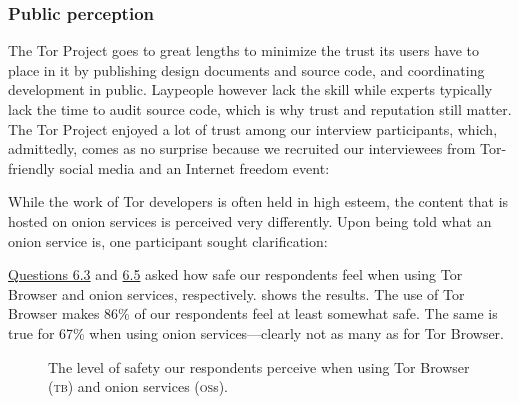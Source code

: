 \subsubsection{Public perception}

The Tor Project goes to great lengths to minimize the trust its users have to
place in it by publishing design documents and source code, and coordinating
development in public.  Laypeople however lack the skill while experts typically
lack the time to audit source code, which is why trust and reputation still
matter.  The Tor Project enjoyed a lot of trust among our interview
participants, which, admittedly, comes as no surprise because we recruited our
interviewees from Tor-friendly social media and an Internet freedom event:

While the work of Tor developers is often held in high esteem, the content that
is hosted on onion services is perceived very differently.  Upon being told what
an onion service is, one participant sought clarification:

\hyperref[q6_3]{Questions 6.3} and \hyperref[q6_5]{6.5} asked how safe our
respondents feel when using Tor Browser and onion services, respectively.
 shows the results.  The use of Tor Browser makes
86\% of our respondents feel at least somewhat safe.  The same is true for 67\%
when using onion services---clearly not as many as for Tor Browser.

\begin{figure}[t]
    \centering
    
    \caption{The level of safety our respondents perceive when using Tor
    Browser (\textsc{tb}) and onion services (\textsc{os}s).}
    \label{fig:perceived-security}
\end{figure}

